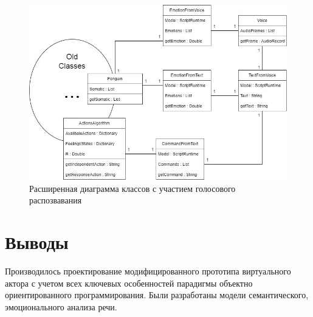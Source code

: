 \begin{figure}[!h]
\includegraphics[width=0.75\columnwidth]{./img/ncmodel0.jpg}
\centering
\caption{Расширенная диаграмма классов с участием голосового распозвавания}
\label{pic:ncmodel0}
\end{figure}

\section{Выводы}

Производилось проектирование модифицированного прототипа виртуального актора 
с учетом всех ключевых особенностей парадигмы объектно ориентированного программирования. 
Были разработаны модели семантического, эмоционального анализа речи.
